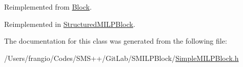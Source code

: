 Reimplemented from \mbox{\hyperlink{class_s_m_spp__di__unipi__it_1_1_block_a59f3f59d72c56028f06c555bdcd36caf}{Block}}.



Reimplemented in \mbox{\hyperlink{class_s_m_spp__di__unipi__it_1_1_structured_m_i_l_p_block_aefb3f33afdab2b6f4aef3f926c10df51}{Structured\+M\+I\+L\+P\+Block}}.



The documentation for this class was generated from the following file\+:\begin{DoxyCompactItemize}
\item 
/\+Users/frangio/\+Codes/\+S\+M\+S++/\+Git\+Lab/\+S\+M\+I\+L\+P\+Block/\mbox{\hyperlink{_simple_m_i_l_p_block_8h}{Simple\+M\+I\+L\+P\+Block.\+h}}\end{DoxyCompactItemize}
